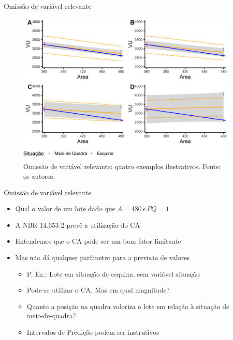 \documentclass[9pt,ignorenonframetext,aspectratio=169]{beamer}
\providecommand{\tightlist}{%
  \setlength{\itemsep}{0pt}\setlength{\parskip}{0pt}}
\begin{document}
\begin{frame}{Omissão de variável relevante}
\protect\hypertarget{omissuxe3o-de-variuxe1vel-relevante}{}

\begin{figure}

{\centering \includegraphics[width=0.7\linewidth]{../../images/modelos-1} 

}

\caption{Omissão de variável relevante: quatro exemplos ilustrativos. Fonte: os autores.}\label{fig:unnamed-chunk-9}
\end{figure}

\end{frame}

\begin{frame}{Omissão de variável relevante}
\protect\hypertarget{omissuxe3o-de-variuxe1vel-relevante-1}{}

\begin{itemize}
\tightlist
\item
  Qual o valor de um lote dado que \(A = 480 \, e\, PQ = 1\)
\end{itemize}

\begin{itemize}[<+->]
\tightlist
\item
  A NBR 14.653-2 prevê a utilização do CA
\item
  Entendemos que o CA pode ser um bom fator limitante
\item
  Mas não dá qualquer parâmetro para a previsão de valores

  \begin{itemize}[<+->]
  \tightlist
  \item
    P. Ex.: Lote em situação de esquina, sem variável situação
  \item
    Pode-se utilizar o CA. Mas em qual magnitude?
  \item
    Quanto a posição na quadra valoriza o lote em relação à situação de
    meio-de-quadra?
  \item
    Intervalos de Predição podem ser instrutivos
  \end{itemize}
\end{itemize}

\end{frame}
\end{document}
